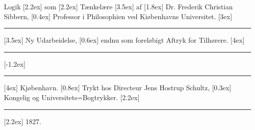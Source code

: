 \documentclass[12pt]{book}
\def\sperr#1{#1}%
\def\\{ }%
\newcommand{\sperr}[1]{\textls[180]{#1}}
\begin{document}
\begin{center}
  {\Huge\sperr{Logik}}\\[2.2ex]
  som\\[2.2ex]
  {\Huge\sperr{Tænkelære}}\\[3.5ex]
  af\\[1.8ex]
  {\large Dr. Frederik Christian Sibbern,}\\[0.4ex]
  {\footnotesize Professor i Philosophien ved Kiøbenhavns Universitet.}\\[3ex]
  \rule{0.42\linewidth}{0.4pt}\\[3.5ex]
  {\large Ny Udarbeidelse,}\\[0.6ex]
  endnu som foreløbigt Aftryk for Tilhørere.\\[4ex]
  \rule{\linewidth}{1.4pt}\\[-1.2ex]
  \rule{\linewidth}{0.4pt}\\[4ex]
  {\large\sperr{Kjøbenhavn.}}\\[0.8ex]
  {\large Trykt hos Directeur Jens Hostrup Schultz,}\\[0.3ex]
  {\footnotesize Kongelig og Universitets=Bogtrykker.}\\[2.2ex]
  \rule{0.20\linewidth}{1.0pt}\\[2.2ex]
  1827.
\end{center}
\end{document}
